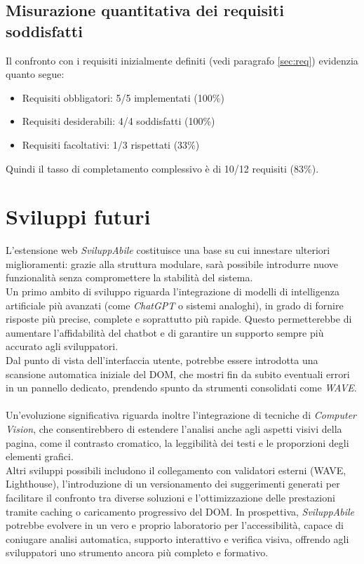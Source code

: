 \subsection{Misurazione quantitativa dei requisiti soddisfatti}
Il confronto con i requisiti inizialmente definiti (vedi paragrafo \ref{sec:req}) evidenzia quanto segue:
\begin{itemize}
    \item Requisiti obbligatori: 5/5 implementati (100\%)
    \item Requisiti desiderabili: 4/4 soddisfatti (100\%)
    \item Requisiti facoltativi: 1/3 rispettati (33\%)
\end{itemize}
Quindi il tasso di completamento complessivo è di 10/12 requisiti (83\%).

\section{Sviluppi futuri}
\noindent L’estensione web \textit{SviluppAbile} costituisce una base su cui innestare ulteriori miglioramenti: grazie alla struttura modulare, sarà possibile introdurre nuove funzionalità senza compromettere la stabilità del sistema.\\
Un primo ambito di sviluppo riguarda l’integrazione di modelli di intelligenza artificiale più avanzati (come \textit{ChatGPT} o sistemi analoghi), in grado di fornire risposte più precise, complete e soprattutto più rapide. Questo permetterebbe di aumentare l’affidabilità del chatbot e di garantire un supporto sempre più accurato agli sviluppatori.\\
Dal punto di vista dell’interfaccia utente, potrebbe essere introdotta una scansione automatica iniziale del DOM, che mostri fin da subito eventuali errori in un pannello dedicato, prendendo spunto da strumenti consolidati come \textit{WAVE}.\\
\\
Un’evoluzione significativa riguarda inoltre l’integrazione di tecniche di \textit{Computer Vision}, che consentirebbero di estendere l’analisi anche agli aspetti visivi della pagina, come il contrasto cromatico, la leggibilità dei testi e le proporzioni degli elementi grafici.\\
Altri sviluppi possibili includono il collegamento con validatori esterni (WAVE, Lighthouse), l’introduzione di un versionamento dei suggerimenti generati per facilitare il confronto tra diverse soluzioni e l’ottimizzazione delle prestazioni tramite caching o caricamento progressivo del DOM.
In prospettiva, \textit{SviluppAbile} potrebbe evolvere in un vero e proprio laboratorio per l’accessibilità, capace di coniugare analisi automatica, supporto interattivo e verifica visiva, offrendo agli sviluppatori uno strumento ancora più completo e formativo.

